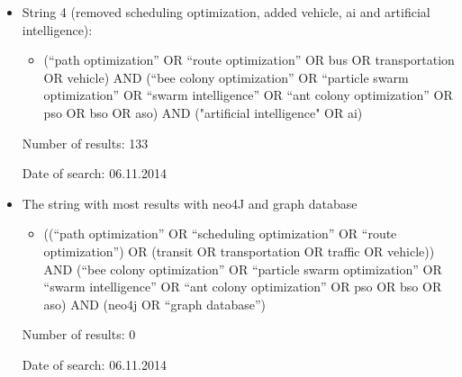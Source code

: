 \begin{itemize}
\item String 4 (removed scheduling optimization, added vehicle, ai and artificial intelligence):
\begin{itemize}
\item(``path optimization''  OR ``route optimization'' OR bus OR transportation OR vehicle) AND (``bee colony optimization'' OR ``particle swarm optimization'' OR ``swarm intelligence'' OR ``ant colony optimization'' OR pso OR bso OR aso)  AND ("artificial intelligence" OR ai) 
\end{itemize}
\par Number of results: 133
\par Date of search: 06.11.2014
\item The string with most results with neo4J and graph database
\begin{itemize}
\item((``path optimization'' OR ``scheduling optimization'' OR ``route optimization'') OR (transit OR transportation OR traffic OR vehicle)) AND (``bee colony optimization'' OR ``particle swarm optimization'' OR ``swarm intelligence'' OR ``ant colony optimization'' OR pso OR bso OR aso) AND (neo4j OR ``graph database'')
\end{itemize}
\par Number of results: 0
\par Date of search: 06.11.2014
\end{itemize}

